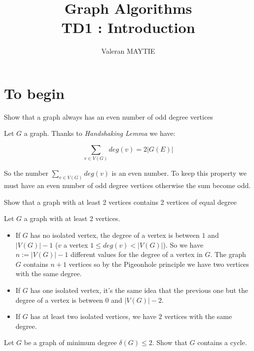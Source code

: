 \documentclass{article}
\title{Graph Algorithms\\TD1 : Introduction}
\author{Valeran MAYTIE}
\date{}
\theoremstyle{plain}
\begin{document}
  \maketitle

  \section{To begin}
 
  \exercice Show that a graph always has an even number of odd degree vertices

  \begin{correction}{}{}
    Let $G$ a graph. Thanks to \textit{Handshaking Lemma} we have:

    $$ \sum_{v \in V(G)} deg(v) = 2|G(E)| $$

    So the number $\sum_{v \in V(G)} deg(v)$ is an even number. To keep this
    property we must have an even number of odd degree vertices otherwise the
    sum become odd.
  \end{correction}

  \exercice Show that a graph with at least 2 vertices contains 2 vertices of
    equal degree

  \begin{correction}{}{}
    Let $G$ a graph with at least 2 vertices.

    \begin{itemize}
      \item If $G$ has no isolated vertex, the degree of a vertex is
        between $1$ and $|V(G)| - 1$ ($v$ a vertex $1 \leq deg(v) < |V(G)|$).
        So we have $n := |V(G)| - 1$ different values for the degree of a vertex
        in $G$. The graph $G$ contains $n + 1$ vertices so by the Pigeonhole
        principle we have two vertices with the same degree.

      \item If $G$ has one isolated vertex, it's the same idea that the previous
        one but the degree of a vertex is between $0$ and $|V(G)| - 2$.

      \item If $G$ has at least two isolated vertices, we have $2$ vertices with
        the same degree.
    \end{itemize}

  \end{correction}

  \exercice Let $G$ be a graph of minimum degree $\delta(G) \leq 2$. Show that
  $G$ contains a cycle.
\end{document}
